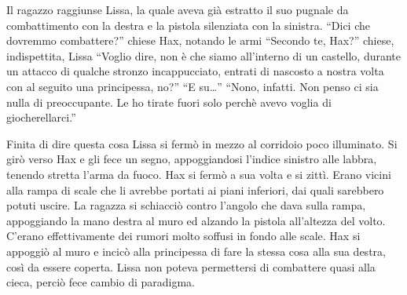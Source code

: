     Il ragazzo raggiunse Lissa, la quale aveva già estratto il suo pugnale
    da combattimento con la destra e la pistola silenziata con la sinistra.
    ``Dici che dovremmo combattere?'' chiese Hax, notando le armi ``Secondo
    te, Hax?'' chiese, indispettita, Lissa ``Voglio dire, non è che siamo
    all'interno di un castello, durante un attacco di qualche stronzo
    incappucciato, entrati di nascosto a nostra volta con al seguito una
    principessa, no?'' ``E su\dots{}'' ``Nono, infatti. Non penso ci sia
    nulla di preoccupante. Le ho tirate fuori solo perchè avevo voglia di
    giocherellarci.''

    Finita di dire questa cosa Lissa si fermò in mezzo al corridoio poco
    illuminato. Si girò verso Hax e gli fece un segno, appoggiandosi
    l'indice sinistro alle labbra, tenendo stretta l'arma da fuoco. 
    Hax si fermò a sua volta e si zittì.
    Erano vicini alla rampa di scale che li avrebbe portati ai piani
    inferiori, dai quali sarebbero potuti uscire. La ragazza si schiacciò
    contro l'angolo che dava sulla rampa, appoggiando la mano destra al
    muro ed alzando la pistola all'altezza del volto. C'erano
    effettivamente dei rumori molto soffusi in fondo alle scale. Hax si
    appoggiò al muro e incicò alla principessa di fare la stessa cosa alla
    sua destra, così da essere coperta. Lissa non poteva permettersi di
    combattere quasi alla cieca, perciò fece cambio di paradigma.
    
